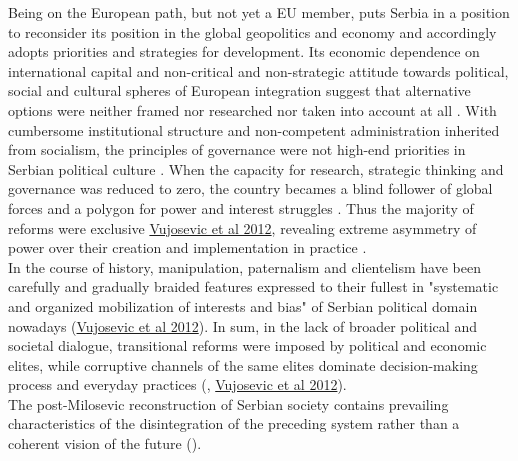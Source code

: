 \documentclass[11pt]{report}
\begin{document}
Being on the European path, but not yet a EU member, puts Serbia in a position to reconsider its position in the global geopolitics and economy and accordingly adopts priorities and strategies for development.
Its economic dependence on international capital and non-critical and non-strategic attitude towards political, social and cultural spheres of European integration suggest that alternative options were neither framed nor researched nor taken into account at all \href{ref}{\citealt{Vujosevic et al 2012}}.
With cumbersome institutional structure and non-competent administration inherited from socialism, the principles of governance were not high-end priorities in Serbian political culture \href{ref}{\citealt{trkulja_serbian_2012}}.
When the capacity for research, strategic thinking and governance was reduced to zero, the country becames a blind follower of global forces and a polygon for power and interest struggles \href{ref}{\citealt{vujosevic_conundrum_2012}}.
Thus the majority of reforms were exclusive \href{ref}{Vujosevic et al 2012}, revealing extreme asymmetry of power over their creation and implementation in practice \href{ref}{\citealt{vujosevic_regionalizam_2015}}.
\\
In the course of history, manipulation, paternalism and clientelism have been carefully and gradually braided features expressed to their fullest in  "systematic and organized mobilization of interests and bias" of Serbian political domain nowadays (\href{ref}{Vujosevic et al 2012}).
In sum, in the lack of broader political and societal dialogue, transitional reforms were imposed by political and economic elites, while corruptive channels of the same elites dominate decision-making process and everyday practices (\href{ref}{\citealt{vujosevic_conundrum_2012}}, \href{ref}{Vujosevic et al 2012}).%
\\

The post-Milosevic reconstruction of Serbian society contains prevailing characteristics of the disintegration of the preceding system rather than a coherent vision of the future (\href{ref}{\citealt{stanilov_post-socialist_2007}}). 
\\
\end{document}
